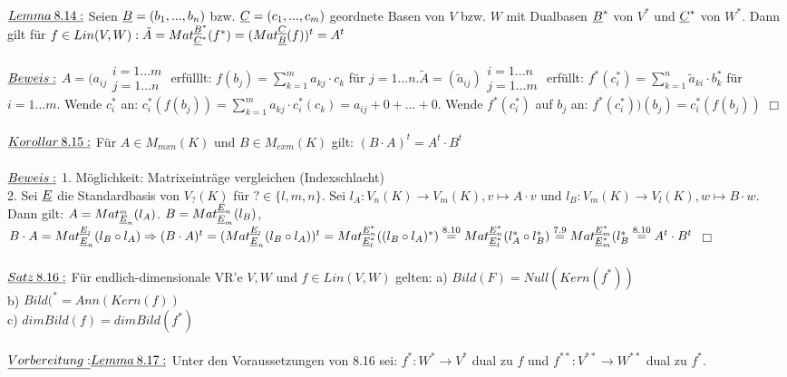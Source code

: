 \documentclass[fleqn, a4paper, 11pt]{article}
\begin{document}
\\
$\uline{Lemma\:8.14:}$ Seien $\uline{B}=(b_1,...,b_n)$ bzw. $\uline{C}=(c_1,...,c_m)$ geordnete Basen von $V$ bzw. $W$ mit Dualbasen $\uline{B}^{\ast}$ von $V^{\ast}$ und $\uline{C}^{\ast}$ von $W^{\ast}$. Dann gilt f\"ur $f\in Lin(V,W):\tilde{A}=Mat_{\uline{C}^{\ast}}^{\uline{B}^{\ast}}(f^{\ast})=(Mat_{\uline{B}}^{\uline{C}}(f))^t=A^t$\\
\\
$\uline{Beweis:}$ $A=(a_{ij}\substack{i=1...m\\j=1...n}$ erf\"ulllt: $f(b_j)=\sum\limits_{k=1}^m a_{kj}\cdot c_k$ f\"ur $j=1...n. \tilde{A}=(\tilde{a}_{ij})\substack{i=1...n\\j=1...m}$ erf\"ullt: $f^{\ast}(c_i^{\ast})=\sum\limits_{k=1}^n \tilde{a}_{ki}\cdot b_k^{\ast}$ f\"ur $i=1...m$. Wende $c_i^{\ast}$ an: $c_i^{\ast}(f(b_j))=\sum\limits_{k=1}^m a_{kj}\cdot c_i^{\ast}(c_k)=a_{ij}+0+...+0$. Wende $f^{\ast}(c_i^{\ast})$ auf $b_j$ an: $f^{\ast}(c_i^{\ast}))(b_j)=c_i^{\ast}(f(b_j))$ \hfill $\Box$\\
\\
$\uline{Korollar\:8.15:}$ F\"ur $A\in M_{mxn}(K)$ und $B\in M_{exm}(K)$ gilt: $(B\cdot A)^t=A^t\cdot B^t$\\
\\
$\uline{Beweis:}$ 1. M\"oglichkeit: Matrixeintr\"age vergleichen (Indexschlacht)\\
2. Sei $\uline{E}$ die Standardbasis von $V_? (K)$ f\"ur $?\in \{l,m,n\}$. Sei $l_A:V_n(K)\rightarrow V_m(K),v\mapsto A\cdot v$ und $l_B:V_m(K)\rightarrow V_l(K),w\mapsto B\cdot w$. Dann gilt: $A=Mat_{\uline{E}_n}^{\uline{}_m}(l_A)$. $B=Mat_{\uline{E}_m}^{\uline{E}_n}(l_B)$, $B\cdot A=Mat_{\uline{E}_n}^{\uline{E}_l}(l_B\circ l_A)\Rightarrow (B\cdot A)^t=(Mat_{\uline{E}_n}^{\uline{E}_l}(l_B\circ l_A))^t=Mat_{\uline{E}_l^{\ast}}^{\uline{E}_n^{\ast}}((l_B\circ l_A)^{\ast})\stackrel{8.10}{=}Mat_{\uline{E}_l^{\ast}}^{\uline{E}_n^{\ast}}(l_A^{\ast}\circ l_B^{\ast})\stackrel{7.9}{=} Mat_{\uline{E}_m^{\ast}}^{\uline{E}_m^{\ast}}(l_B^{\ast}\stackrel{8.10}{=} A^t\cdot B^t$ \hfill $\Box$\\
\\
$\uline{Satz\:8.16:}$ F\"ur endlich-dimensionale VR'e $V,W$ und $f\in Lin(V,W)$ gelten: a) $Bild(F)=Null(Kern(f^{\ast}))$\\
b) $Bild(^{\ast}=Ann(Kern(f))$\\
c) $dim Bild(f)=dim Bild(f^{\ast})$\\
\\
$\uline{Vorbereitung:}\uline{Lemma\:8.17:}$ Unter den Voraussetzungen von 8.16 sei: $f^{\ast}:W^{\ast}\rightarrow V^{\ast}$ dual zu $f$ und $f^{\ast\ast}:V^{\ast\ast}\rightarrow W^{\ast\ast}$ dual zu $f^{\ast}$.\\
\end{document}
